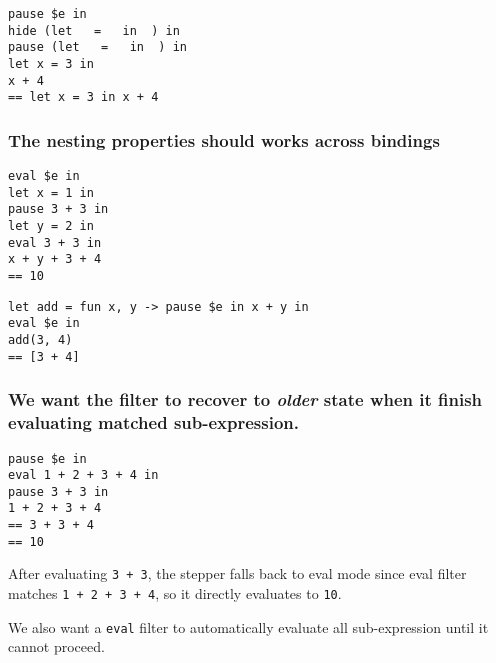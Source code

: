 \begin{verbatim}
pause $e in
hide (let   =   in  ) in
pause (let   =   in  ) in
let x = 3 in
x + 4
== let x = 3 in x + 4
\end{verbatim}

\subsubsection{The nesting properties should works across bindings}

\begin{verbatim}
eval $e in
let x = 1 in
pause 3 + 3 in
let y = 2 in
eval 3 + 3 in
x + y + 3 + 4
== 10
\end{verbatim}

\begin{verbatim}
let add = fun x, y -> pause $e in x + y in
eval $e in
add(3, 4)
== [3 + 4]
\end{verbatim}


\subsubsection{We want the filter to recover to \emph{older} state when it finish
evaluating matched sub-expression.}

\begin{verbatim}
pause $e in
eval 1 + 2 + 3 + 4 in
pause 3 + 3 in
1 + 2 + 3 + 4
== 3 + 3 + 4
== 10
\end{verbatim}

After evaluating \verb|3 + 3|, the stepper falls back to eval mode
since eval filter matches \verb|1 + 2 + 3 + 4|, so it directly
evaluates to \verb|10|.

We also want a \verb|eval| filter to automatically evaluate all sub-expression
until it cannot proceed.






